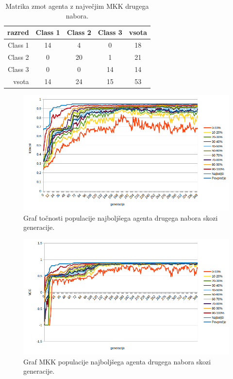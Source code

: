 \begin{table}[H]
    \centering
    \begin{tabular}{||rcccc||}
        \hline
        razred  & Class 1 & Class 2 & Class 3 & vsota \\ \hline
        Class 1 & 14      & 4       & 0       & 18    \\ \hline
        Class 2 & 0       & 20      & 1       & 21    \\ \hline
        Class 3 & 0       & 0       & 14      & 14    \\ \hline
        vsota   & 14      & 24      & 15      & 53    \\ \hline
    \end{tabular}
    \caption{Matrika zmot agenta z največjim MKK drugega nabora.}
    \label{tab:wine_mcc_2}
\end{table}

\begin{figure}[H]
    \begin{center}
        \includegraphics[width=13cm]{wine/2/acc}
    \end{center}
    \caption{Graf točnosti populacije najboljšega agenta drugega nabora skozi generacije.}
    \label{fig:wine_acc_2}
\end{figure}

\begin{figure}[H]
    \begin{center}
        \includegraphics[width=13cm]{wine/2/mcc}
    \end{center}
    \caption{Graf MKK populacije najboljšega agenta drugega nabora skozi generacije.}
    \label{fig:wine_mcc_2}
\end{figure}

